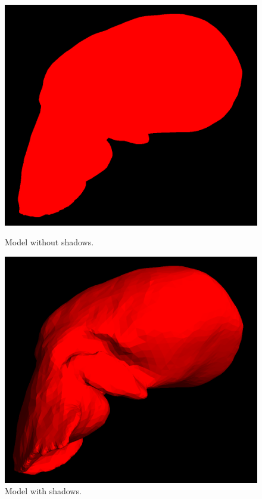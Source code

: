 \documentclass[12pt]{report}
\begin{document}
\begin{figure}[H]
\centerline{\includegraphics[scale = 0.3]{img/modelWithoutShadows.png}}
\caption{Model without shadows.}
\label{modelwithoutshadows}
\endminipage\hfill
{}
\centerline{\includegraphics[scale = 0.3]{img/modelWithShadows.png}}
\caption{Model with shadows.}
\label{modelwithshadows}
\endminipage
\end{figure}
\end{document}
